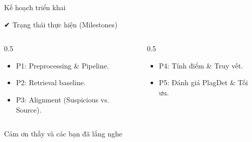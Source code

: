 \documentclass[aspectratio=169,11pt]{beamer}
\def\textbf#1{#1}%
\def\\{ }%
\begin{document}
\begin{frame}{Kế hoạch triển khai}

\vspace{0.2cm}

\begin{block}{\rule{0pt}{2.0ex}✔ Trạng thái thực hiện (Milestones)}
\small
\vspace{0.1cm}
\begin{columns}[T]
    \begin{column}{0.5\textwidth}
        \begin{itemize}
            \item[\textcolor{successgreen}{$\checkmark$}] \textbf{P1:} Preprocessing \& Pipeline.
            \item[\textcolor{successgreen}{$\checkmark$}] \textbf{P2:} Retrieval baseline.
            \item[\textcolor{successgreen}{$\checkmark$}] \textbf{P3:} Alignment (Suspicious vs. Source).
        \end{itemize}
    \end{column}
    \begin{column}{0.5\textwidth}
        \begin{itemize}
            \item[\textcolor{successgreen}{$\checkmark$}] \textbf{P4:} Tính điểm \& Truy vết.
            \item[\textcolor{successgreen}{$\checkmark$}] \textbf{P5:} Đánh giá PlagDet \& Tối ưu.
        \end{itemize}
    \end{column}
\end{columns}
\vspace{0.1cm}
\end{block}

\end{frame}
{

\begin{frame}[plain]
    \vfill
    \centering
    \textcolor{hcmusblue}{\textbf{\Huge Cảm ơn thầy và các bạn đã lắng nghe}}
    \vfill
\end{frame}
}
\end{document}
